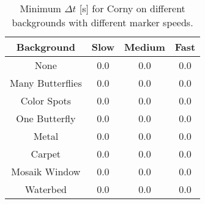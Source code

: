 \begin{table}[H]
\center
\begin{tabular}{|c|c|c|c|}
\hline
Background & Slow & Medium & Fast \\ \hline
None & 0.0 & 0.0 & 0.0 \\ \hline
Many Butterflies & 0.0 & 0.0 & 0.0 \\ \hline
Color Spots & 0.0 & 0.0 & 0.0 \\ \hline
One Butterfly & 0.0 & 0.0 & 0.0 \\ \hline
Metal & 0.0 & 0.0 & 0.0 \\ \hline
Carpet & 0.0 & 0.0 & 0.0 \\ \hline
Mosaik Window & 0.0 & 0.0 & 0.0 \\ \hline
Waterbed & 0.0 & 0.0 & 0.0 \\ \hline
\end{tabular}
\caption{Minimum $\Delta t$ [s] for Corny on different backgrounds with different marker speeds.}
\end{table}






